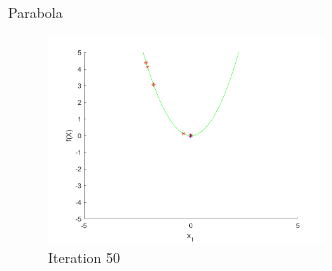\documentclass[xcolor=table]{beamer}
\begin{document}
\begin{frame}{Parabola}
  \begin{figure}[h]
  \begin{center}
    \includegraphics[width=0.65\textwidth]{img/smpl/circ/loa-iter-50}
    \caption{Iteration 50}
  \end{center}
  \end{figure}
\end{frame}
\end{document}
